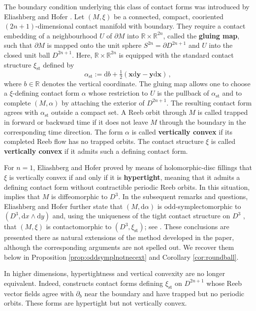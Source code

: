 \documentclass{amsart}
\theoremstyle{definition}
\newcommand{\rmd}{\mathrm d}
\newcommand{\R}{\mathbb R}
\newcommand{\bfx}{\mathbf x}
\newcommand{\bfy}{\mathbf y}
\DeclareMathOperator{\st}{\mathrm{st}}
\begin{document}
The boundary condition underlying
this class of contact forms
was introduced by Eliashberg and Hofer \cite{eh94}.
Let $(M,\xi)$ be a connected, compact, cooriented
$(2n+1)$-dimensional contact manifold with boundary.
They require a contact embedding
of a neighbourhood $U$ of $\partial M$
into $\R\times\R^{2n}$,
called the {\bf gluing map},
such that $\partial M$ is mapped
onto the unit sphere
$S^{2n}=\partial D^{2n+1}$
and $U$ into the closed unit ball $D^{2n+1}$.
Here,
$\R\times\R^{2n}$ is equipped with
the standard contact structure $\xi_{\st}$
defined by
\[
\alpha_{\st}:=
\rmd b+\tfrac12(\bfx\rmd\bfy-\bfy\rmd\bfx)
\,,
\]
where $b\in\R$ denotes the vertical coordinate.
The gluing map allows one to choose
a $\xi$-defining contact form $\alpha$
whose restriction to $U$ is the pullback
of $\alpha_{\st}$
and to complete $(M,\alpha)$
by attaching the exterior of $D^{2n+1}$.
The resulting contact form agrees with
$\alpha_{\st}$ outside a compact set.
A Reeb orbit through $M$ is called trapped
in forward or backward time
if it does not leave $M$ through the boundary
in the corresponding time direction.
The form $\alpha$ is called {\bf vertically convex}
if its completed Reeb flow has no trapped orbits.
The contact structure $\xi$ is called
{\bf vertically convex}
if it admits such a defining contact form.

For $n=1$,
Eliashberg and Hofer \cite{eh94}
proved by means of holomorphic-disc fillings
that $\xi$ is vertically convex
if and only if it is {\bf hypertight},
meaning that it admits a defining contact form
without contractible periodic Reeb orbits.
In this situation,
\cite[Theorem~1]{eh94} implies that
$M$ is diffeomorphic to $D^3$.
In the subsequent remarks and questions,
Eliashberg and Hofer further state that
$(M,\rmd\alpha)$ is odd-symplectomorphic to
$(D^3,\rmd x\wedge\rmd y)$
and, using the uniqueness
of the tight contact structure on $D^3$
\cite{elia92},
that $(M,\xi)$ is contactomorphic to
$(D^3,\xi_{\st})$;
see \cite[p.\ 1305, Items~1.a) and 1.b)]{eh94}.
These conclusions are presented there
as natural extensions of the method developed in the paper,
although the corresponding arguments are not spelled out.
We recover them below in
Proposition \ref{prop:oddsymplnotnecext}
and Corollary \ref{cor:roundball}.

In higher dimensions,
hypertightness and vertical convexity
are no longer equivalent.
Indeed, \cite{grz14} constructs contact forms
defining $\xi_{\st}$ on $D^{2n+1}$
whose Reeb vector fields agree with $\partial_b$
near the boundary
and have trapped but no periodic orbits.
These forms are hypertight
but not vertically convex.
\end{document}
